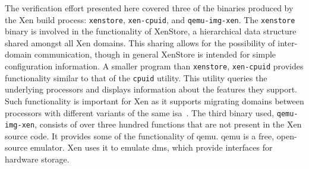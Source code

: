The verification effort presented here
covered three of the binaries produced by the Xen build process:
\lstinline|xenstore|, \lstinline|xen-cpuid|, and \lstinline|qemu-img-xen|.
The \lstinline|xenstore| binary is involved in the functionality of
XenStore,
a hierarchical data structure shared amongst all Xen domains.
This sharing allows for the possibility of inter-domain communication,
though in general XenStore is intended for simple configuration information.
A smaller program than \lstinline|xenstore|, \lstinline|xen-cpuid|
provides functionality similar to that of the
\lstinline|cpuid| utility.
This utility queries the underlying processors
and displays information about the features they support.
Such functionality is important for Xen
as it supports migrating domains
between processors with different variants of the same \ac{isa}~\citep{cpuid-masking}.
The third binary used, \lstinline|qemu-img-xen|,
consists of over three hundred functions
that are not present in the Xen source code.
It provides some of the functionality of \ac{qemu}.
\Ac{qemu} is a free, open-source emulator.%
Xen uses it to emulate \acp{dm}, which provide interfaces for hardware storage.

